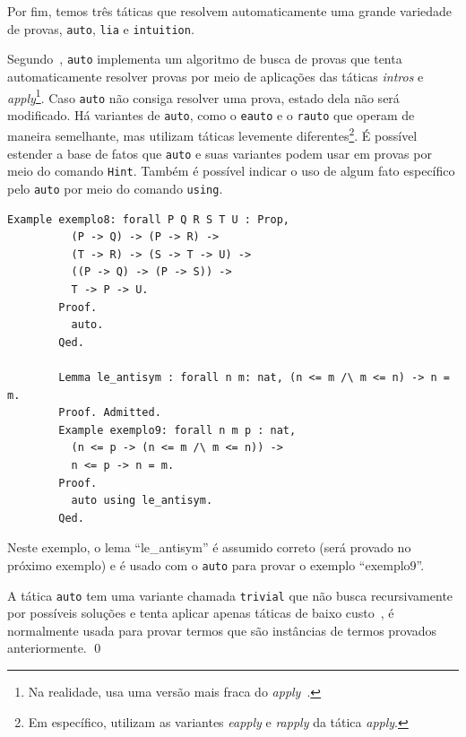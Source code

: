 
			Por fim, temos três táticas que resolvem automaticamente uma grande variedade de provas, \texttt{auto}, \texttt{lia} e \texttt{intuition}.

			\begin{exemplo}
				Segundo~, \texttt{auto} implementa um algoritmo de busca de provas que tenta automaticamente resolver provas
				por meio de aplicações das táticas \textit{intros} e \textit{apply}\footnote{Na realidade, usa uma versão mais fraca do \textit{apply}~\cite{coqteam2022manual}.}.
				Caso \texttt{auto} não consiga resolver uma prova, estado dela não será modificado.
				Há variantes de \texttt{auto}, como o \texttt{eauto} e o \texttt{rauto} que operam de maneira semelhante, mas utilizam táticas levemente
				diferentes\footnote{Em específico, utilizam as variantes \textit{eapply} e \textit{rapply} da tática \textit{apply}.}.
				É possível estender a base de fatos que \texttt{auto} e suas variantes podem usar em provas por meio do comando \texttt{Hint}. Também é possível indicar
				o uso de algum fato específico pelo \texttt{auto} por meio do comando \texttt{using}.
				\begin{lstlisting}[language=coq]
		Example exemplo8: forall P Q R S T U : Prop,
		  (P -> Q) -> (P -> R) ->
		  (T -> R) -> (S -> T -> U) ->
		  ((P -> Q) -> (P -> S)) ->
		  T -> P -> U.
		Proof.
		  auto.
		Qed.

		Lemma le_antisym : forall n m: nat, (n <= m /\ m <= n) -> n = m.
		Proof. Admitted.
		Example exemplo9: forall n m p : nat,
		  (n <= p -> (n <= m /\ m <= n)) ->
		  n <= p -> n = m.
		Proof.
		  auto using le_antisym.
		Qed.
		\end{lstlisting}


				Neste exemplo, o lema ``le\_antisym'' é assumido correto (será provado no próximo exemplo) e é usado com o \texttt{auto} para provar o exemplo ``exemplo9''.

				A tática \texttt{auto} tem uma variante chamada \texttt{trivial} que não busca recursivamente por possíveis soluções e tenta aplicar apenas táticas
				de baixo custo~\cite{coqteam2022manual}, é normalmente usada para provar termos que são instâncias de termos provados anteriormente. \qed
			\end{exemplo}

